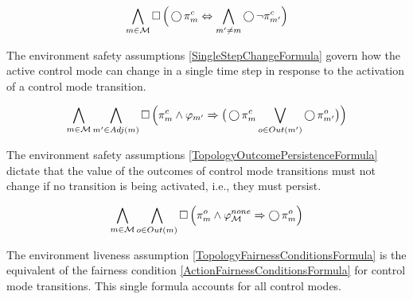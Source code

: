 \begin{equation}\label{TopologyMutexFormula}
	\bigwedge \limits_{m \in \mathcal{M}} \operatorname{\Box} \Big( \operatorname{\bigcirc} \pi_m^c \Leftrightarrow \bigwedge \limits_{m^\prime \neq m} \operatorname{\bigcirc} \lnot \pi_{m^\prime}^c \Big)
\end{equation}

The environment safety assumptions \eqref{SingleStepChangeFormula} govern how the active control mode can change in a single time step in response to the activation of a control mode transition.

\begin{equation}\label{SingleStepChangeFormula}
	\bigwedge \limits_{m \in \mathcal{M}} \bigwedge \limits_{m^\prime \in Adj(m)} \operatorname{\Box} \Big( \pi_m^c \wedge  \varphi_{m^\prime} \Rightarrow \big( \operatorname{\bigcirc} \pi_{m}^c \bigvee \limits_{o \in Out(m^\prime)} \operatorname{\bigcirc} \pi_{m^\prime}^o \big) \Big)
\end{equation}

%

The environment safety assumptions \eqref{TopologyOutcomePersistenceFormula} dictate that the value of the outcomes of control mode transitions must not change if no transition is being activated, i.e., they must persist.

\begin{equation}\label{TopologyOutcomePersistenceFormula}
	\bigwedge \limits_{m \in \mathcal{M}} \bigwedge \limits_{o \in Out(m)} \operatorname{\Box} \Big( \pi_m^o \wedge \varphi_\mathcal{M}^{none} \Rightarrow \operatorname{\bigcirc} \pi_m^o \Big)
\end{equation}

The environment liveness assumption \eqref{TopologyFairnessConditionsFormula} is the equivalent of the fairness condition \eqref{ActionFairnessConditionsFormula} for control mode transitions.
This single formula accounts for all control modes.


